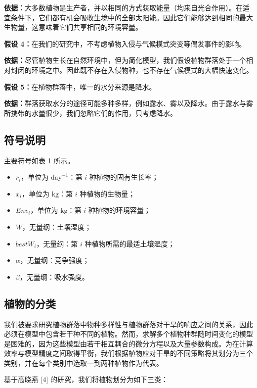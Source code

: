 \documentclass[11pt,a4paper]{ctexart}
\begin{document}
\textbf{依据：}大多数植物是生产者，并以相同的方式获取能量（均来自光合作用）。在适宜条件下，它们都有机会吸收生境中的全部太阳能。因此它们能够达到相同的最大生物量，这意味着它们共享相同的环境容量。

\textbf{假设 4：}在我们的研究中，不考虑植物入侵与气候模式突变等偶发事件的影响。

\textbf{依据：}尽管植物生长在自然环境中，但为简化模型，我们假设植物群落处于一个相对封闭的环境之中。因此既不存在入侵物种，也不存在气候模式的大幅快速变化。

\textbf{假设 5：}在植物群落中，唯一的水分来源是降水。

\textbf{依据：}群落获取水分的途径可能多种多样，例如露水、雾以及降水。由于露水与雾所携带的水量很少，我们忽略它们的作用，只考虑降水。

\subsection{符号说明}

主要符号如表 1 所示。

\begin{itemize}
\item $r_i$，单位为 $\mathrm{day}^{-1}$：第 $i$ 种植物的固有生长率；
\item $x_i$，单位为 $\mathrm{kg}$：第 $i$ 种植物的生物量；
\item $Env_i$，单位为 $\mathrm{kg}$：第 $i$ 种植物的环境容量；
\item $W$，无量纲：土壤湿度；
\item $bestW_i$，无量纲：第 $i$ 种植物所需的最适土壤湿度；
\item $\alpha$，无量纲：竞争强度；
\item $\beta$，无量纲：吸水强度。
\end{itemize}

\subsection{植物的分类}

我们被要求研究植物群落中物种多样性与植物群落对干旱的响应之间的关系，因此必须在模型中包含若干种不同的植物。然而，求解多个植物种群随时间变化的模型是困难的，因为这些模型由若干相互耦合的微分方程以及大量参数构成。为在计算效率与模型精度之间取得平衡，我们根据植物应对干旱的不同策略将其划分为三个类别，并在每个类别中选取一到两种植物作为代表。

基于高晓燕 [4] 的研究，我们将植物划分为如下三类：
\end{document}
